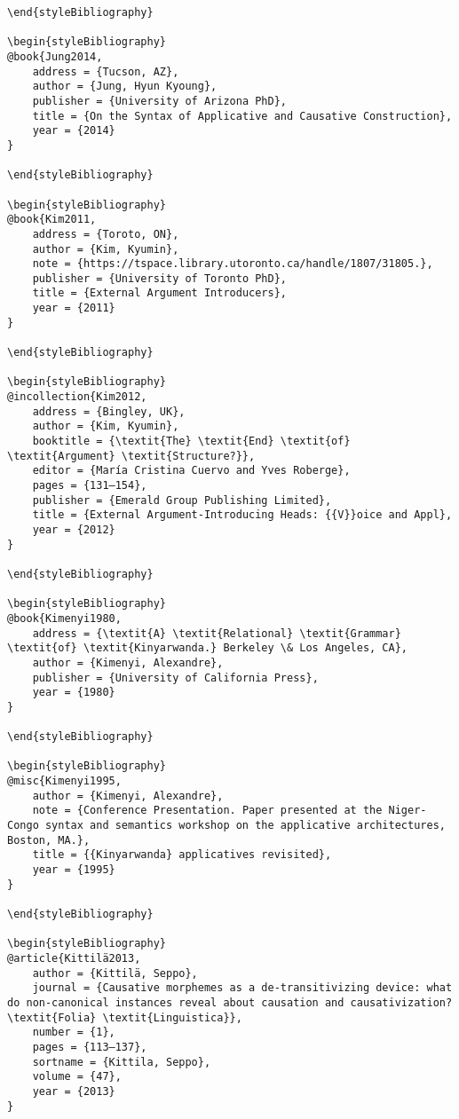 \documentclass[output=paper]{langscibook}
\begin{document}
\begin{verbatim}
\end{styleBibliography}

\begin{styleBibliography}
@book{Jung2014,
	address = {Tucson, AZ},
	author = {Jung, Hyun Kyoung},
	publisher = {University of Arizona PhD},
	title = {On the Syntax of Applicative and Causative Construction},
	year = {2014}
}

\end{styleBibliography}

\begin{styleBibliography}
@book{Kim2011,
	address = {Toroto, ON},
	author = {Kim, Kyumin},
	note = {https://tspace.library.utoronto.ca/handle/1807/31805.},
	publisher = {University of Toronto PhD},
	title = {External Argument Introducers},
	year = {2011}
}

\end{styleBibliography}

\begin{styleBibliography}
@incollection{Kim2012,
	address = {Bingley, UK},
	author = {Kim, Kyumin},
	booktitle = {\textit{The} \textit{End} \textit{of} \textit{Argument} \textit{Structure?}},
	editor = {María Cristina Cuervo and Yves Roberge},
	pages = {131–154},
	publisher = {Emerald Group Publishing Limited},
	title = {External Argument-Introducing Heads: {{V}}oice and Appl},
	year = {2012}
}

\end{styleBibliography}

\begin{styleBibliography}
@book{Kimenyi1980,
	address = {\textit{A} \textit{Relational} \textit{Grammar} \textit{of} \textit{Kinyarwanda.} Berkeley \& Los Angeles, CA},
	author = {Kimenyi, Alexandre},
	publisher = {University of California Press},
	year = {1980}
}

\end{styleBibliography}

\begin{styleBibliography}
@misc{Kimenyi1995,
	author = {Kimenyi, Alexandre},
	note = {Conference Presentation. Paper presented at the Niger-Congo syntax and semantics workshop on the applicative architectures, Boston, MA.},
	title = {{Kinyarwanda} applicatives revisited},
	year = {1995}
}

\end{styleBibliography}

\begin{styleBibliography}
@article{Kittilä2013,
	author = {Kittilä, Seppo},
	journal = {Causative morphemes as a de-transitivizing device: what do non-canonical instances reveal about causation and causativization? \textit{Folia} \textit{Linguistica}},
	number = {1},
	pages = {113–137},
	sortname = {Kittila, Seppo},
	volume = {47},
	year = {2013}
}


\end{verbatim}
\end{document}
